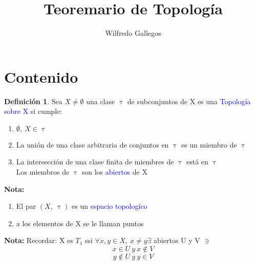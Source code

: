 \documentclass{article}
\title{Teoremario de Topología}
\author{Wilfredo Gallegos}
\theoremstyle{definition}
\newtheorem{definition}{Definición}[section]
\begin{document}
\maketitle

\section{Contenido}
\begin{definition}
 	Sea $X\neq \emptyset$ una clase $\uptau$ de	subconjuntos de X es una \textcolor{blue}{Topología sobre X} si cumple:
 	\begin{enumerate}
 	\item $\emptyset,\ X\in \uptau$
 	\item  La unión de una clase arbitraria de conjuntos en $\uptau$ es un miembro de $\uptau$
 	\item La intersección de una clase finita de miembres de $\uptau$ está en $\uptau$\\
 	Los miembros de $\uptau$ son los \textcolor{blue}{abiertos} de X 
	\end{enumerate}
\end{definition}
\textbf{Nota: } 
\begin{enumerate}
	\item El par $(X,\ \uptau)$ es un \textcolor{blue}{espacio topologíco} 
	\item a los elementos de X se le llaman puntos
\end{enumerate}


\textbf{Nota: } Recordar: X es $T_1$ ssi $\forall x,y\in X,\ x\neq y\exists$ abiertos U y V $\ni$
	\[x\in U \ y \ x\not\in V\]
	\[y\not\in U \ y \ y\in V\]
\end{document}
